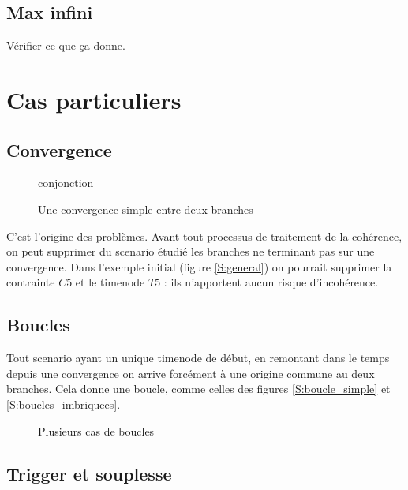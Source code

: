 \documentclass[10pt,a4paper]{article}
\begin{document}
	\subsection{Max infini}
	Vérifier ce que ça donne.
	
\section{Cas particuliers}

	\subsection{Convergence}
	\begin{figure}[htp]
		\centering
		
		\schemaScenario conjonction
		\caption{Une convergence simple entre deux branches}
		\label{S:conjonction}
	\end{figure}
C'est l'origine des problèmes. Avant tout processus de traitement de la cohérence, on peut supprimer du scenario étudié les branches ne terminant pas sur une convergence. Dans l'exemple initial (figure \ref{S:general}) on pourrait supprimer la contrainte $C5$ et le timenode $T5$ : ils n'apportent aucun risque d'incohérence.

	\subsection{Boucles}
Tout scenario ayant un unique timenode de début, en remontant dans le temps depuis une convergence on arrive forcément à une origine commune au deux branches. Cela donne une boucle, comme celles des figures \ref{S:boucle_simple} et \ref{S:boucles_imbriquees}.
	
	\begin{figure}[htp]
		\begin{center}
					\hspace{5pt}
			
				\caption{Plusieurs cas de boucles}
		\end{center}
	\end{figure}
	
	\subsection{Trigger et souplesse}
\end{document}
